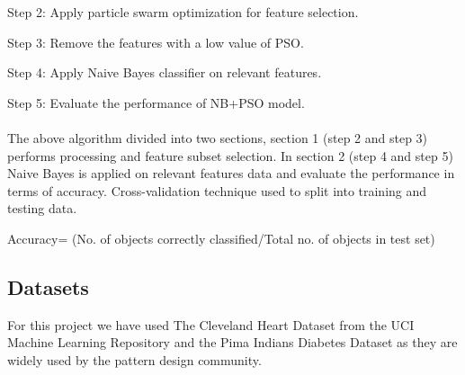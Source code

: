 \documentclass[oneside,12pt]{Classes/VTU}
\begin{document}
    Step 2: Apply particle swarm optimization for feature selection. 
    
    Step 3: Remove the features with a low value of PSO.
    
    Step 4: Apply Naive Bayes classifier on relevant features. 
    
    Step 5: Evaluate the performance of NB+PSO model.
    
    \paragraph{}
    The above algorithm divided into two sections, section 1 (step 2 and step 3) performs processing and feature subset selection. In section 2 (step 4 and step 5) Naive Bayes is applied on relevant features data and evaluate the performance in terms of accuracy. Cross-validation technique used to split into training and testing data.        
    \begin{center}
    	Accuracy= (No. of objects correctly classified/Total no. of objects in test set)      
    \end{center}
    
    
    \subsection{Datasets}
    For this project we have used The Cleveland Heart Dataset from the UCI Machine Learning Repository and the Pima Indians Diabetes Dataset as they are widely used by the pattern design community. 
    \linebreak
\end{document}
